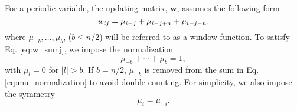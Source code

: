 \documentclass[preprint, superscriptaddress, floatfix]{revtex4-1}
\begin{document}



For a periodic variable\cite{dama2014},
the updating matrix, $\mathbf w$,
assumes the following form
%
\begin{equation}
  w_{ij}
  =
  \mu_{i-j}
  +
  \mu_{i-j+n}
  +
  \mu_{i-j-n}
  ,
\notag
\end{equation}
%
where
$\mu_{-b}, \dots, \mu_b$, ($b \le n/2$)
will be referred to as a window function.
%
To satisfy Eq. \eqref{eq:w_sumj},
we impose the normalization
%
\begin{equation}
  \mu_{-b} + \cdots + \mu_b = 1
  ,
\label{eq:mu_normalization}
\end{equation}
%
with $\mu_l = 0$ for $|l| > b$.
%
If $b = n/2$, $\mu_{-b}$ is removed
from the sum in Eq. \eqref{eq:mu_normalization}
to avoid double counting.
%
For simplicity, we also impose the symmetry
%
\begin{equation}
  \mu_i = \mu_{-i}
  .
\label{eq:mu_symm}
\end{equation}
\end{document}

